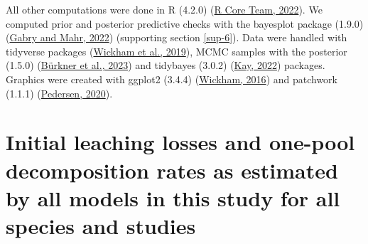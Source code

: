 \documentclass[
  12pt,
]{article}
\begin{document}
All other computations were done in R (4.2.0) (\protect\hyperlink{ref-RCoreTeam.2022}{R Core Team, 2022}). We computed prior and posterior predictive checks with the bayesplot package (1.9.0) (\protect\hyperlink{ref-Gabry.2022}{Gabry and Mahr, 2022}) (supporting section \ref{sup-6}). Data were handled with tidyverse packages (\protect\hyperlink{ref-Wickham.2019}{Wickham et al., 2019}), MCMC samples with the posterior (1.5.0) (\protect\hyperlink{ref-Burkner.2023}{Bürkner et al., 2023}) and tidybayes (3.0.2) (\protect\hyperlink{ref-Kay.2022}{Kay, 2022}) packages. Graphics were created with ggplot2 (3.4.4) (\protect\hyperlink{ref-Wickham.2016}{Wickham, 2016}) and patchwork (1.1.1) (\protect\hyperlink{ref-Pedersen.2020}{Pedersen, 2020}).

\hypertarget{sup-7}{%
\section{Initial leaching losses and one-pool decomposition rates as estimated by all models in this study for all species and studies}\label{sup-7}}
\end{document}
